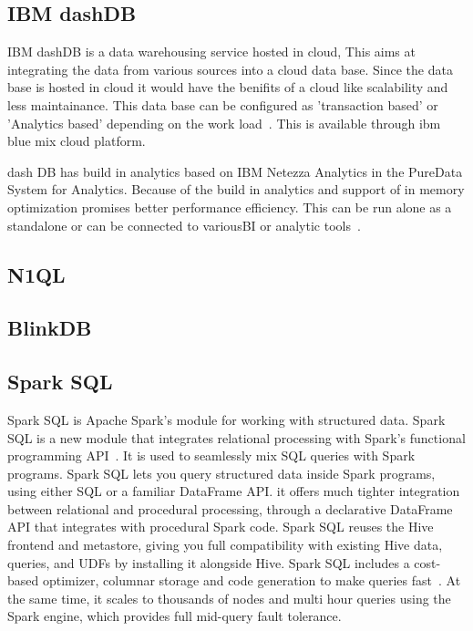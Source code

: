 \subsection{IBM dashDB }

IBM dashDB is a data warehousing service hosted in cloud, This aims
at integrating the data from various sources into a cloud data
base. Since the data base is hosted in cloud it would have the
benifits of a cloud like scalability and less maintainance. This data
base can be configured as 'transaction based' or 'Analytics based'
depending on the work load~\cite{www-ibm-dash-db.com}. This is
available through ibm blue mix cloud platform.

dash DB has build in analytics based on IBM Netezza Analytics in the
PureData System for Analytics. Because of the build in analytics and
support of in memory optimization promises better performance
efficiency.  This can be run alone as a standalone or can be connected
to variousBI or analytic tools~\cite{www-ibm-analytics.com}.

     \pv
       
\subsection{N1QL}

\pv

\subsection{BlinkDB}

\pv

\subsection{Spark SQL}

Spark SQL is Apache Spark's module for working with structured
data. Spark SQL is a new module that integrates relational processing
with Spark's functional programming API~\cite{www-spark-sql}. It is
used to seamlessly mix SQL queries with Spark programs. Spark SQL lets
you query structured data inside Spark programs, using either SQL or a
familiar DataFrame API.  it offers much tighter integration between
relational and procedural processing, through a declarative DataFrame
API that integrates with procedural Spark code.  Spark SQL reuses the
Hive frontend and metastore, giving you full compatibility with
existing Hive data, queries, and UDFs by installing it alongside
Hive. Spark SQL includes a cost-based optimizer, columnar storage and
code generation to make queries fast~\cite{www-spark-sql-2}. At the
same time, it scales to thousands of nodes and multi hour queries
using the Spark engine, which provides full mid-query fault tolerance.

